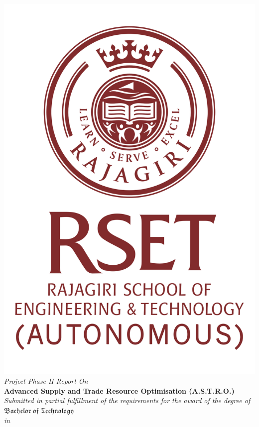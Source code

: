 \begin{center}
	\includegraphics[scale=0.35]{Figures/logo1.png}\\[0.2cm]
	\large \textit{Project Phase II Report On}\\[0.3cm]
	\Large \textbf{Advanced Supply and Trade Resource Optimisation (A.S.T.R.O.)}\\[0.3cm]
	\textit{Submitted in partial fulfillment of the
		requirements for the award of the degree of}\\[0.3cm]
	{\huge {$\mathfrak {Bachelor\; of\; Technology}$}}\\[.3cm]
	\textit{in}\\[.2cm]

\end{center}
